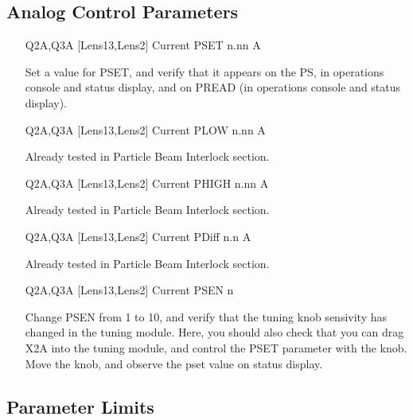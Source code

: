 \documentclass[11pt]{book}		%
\begin{document}
\color{black}


\subsection{Analog Control Parameters}\label{sect:cyc-equip-ctl-beamline-quad23a-analog-control}

\begin{enumerate}
 \item [Q2A,Q3A] [Lens13,Lens2] Current PSET  n.nn A

\color{red}
Set a value for PSET, and verify that it appears on the PS, in operations console and status display, and on PREAD (in operations console and status display).
\color{black}

 \item [Q2A,Q3A] [Lens13,Lens2] Current PLOW  n.nn A

\color{red}
Already tested in Particle Beam Interlock section.
\color{black}

 \item [Q2A,Q3A] [Lens13,Lens2] Current PHIGH n.nn A

\color{red}
Already tested in Particle Beam Interlock section.
\color{black}

 \item [Q2A,Q3A] [Lens13,Lens2] Current PDiff n.n A

\color{red}
Already tested in Particle Beam Interlock section.
\color{black}

 \item [Q2A,Q3A] [Lens13,Lens2] Current PSEN  n

\color{red}

Change PSEN from 1 to 10, and verify that the tuning knob sensivity has changed in the tuning module. Here, you should also check that you can drag X2A into the tuning module, and control the PSET parameter with the knob. Move the knob, and observe the pset value on status display.

\color{black}

\end{enumerate}

\subsection{Parameter Limits} \label{sect:cyc-equip-ctl-beamline-quad23a-analog-control-limits}
\end{document}
